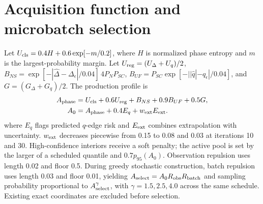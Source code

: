 \section{Acquisition function and microbatch selection}
Let $U_{\rm cls}=0.4H+0.6\exp[-m/0.2]$, where $H$ is normalized phase entropy and $m$ is the largest-probability margin. Let $U_{\rm reg}=(U_\Delta+U_q)/2$, $B_{NS}=\exp[-|\hat\Delta-\Delta_\epsilon|/0.04]\,4P_NP_{SC}$, $B_{UF}=P_{SC}\exp[-||\hat q|-q_\epsilon|/0.04]$, and $G=(G_\Delta+G_q)/2$.  The production profile is
\begin{align} A_{\rm phase}&=U_{\rm cls}+0.6U_{\rm reg}+B_{NS}+0.9B_{UF}+0.5G,\notag\\ A_0&=A_{\rm phase}+0.4E_q+w_{\rm ext}E_{\rm ext}.\end{align}
where $E_q$ flags predicted $q$-edge risk and $E_{\rm ext}$ combines extrapolation with uncertainty. $w_{\rm ext}$ decreases piecewise from 0.15 to 0.08 and 0.03 at iterations 10 and 30. High-confidence interiors receive a soft penalty; the active pool is set by the larger of a scheduled quantile and $0.7p_{95}(A_0)$.  Observation repulsion uses length 0.02 and floor 0.5. During greedy stochastic construction, batch repulsion uses length 0.03 and floor 0.01, yielding $A_{\rm select}=A_0R_{\rm obs}R_{\rm batch}$ and sampling probability proportional to $A_{\rm select}^\gamma$, with $\gamma=1.5,2.5,4.0$ across the same schedule. Existing exact coordinates are excluded before selection.
